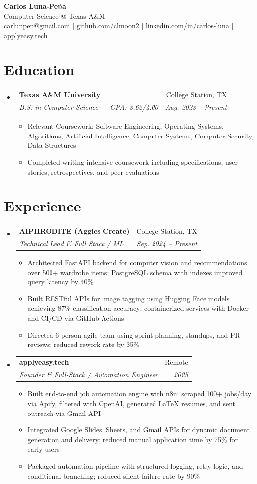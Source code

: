 \documentclass[letterpaper,11pt]{article}
\makeatletter
\newcommand{\resumeItem}[1]{
  \item\small{{#1 \vspace{-2pt}}}
}
\newcommand{\resumeSubheading}[4]{
  \vspace{-2pt}\item
    \begin{tabular*}{0.97\textwidth}[t]{l@{\extracolsep{\fill}}r}
      \textbf{#1} & #2 \\
      \textit{\small#3} & \textit{\small #4} \\
    \end{tabular*}\vspace{-7pt}
}
\newcommand{\resumeSubHeadingListStart}{\begin{itemize}[leftmargin=0.15in, label={}]}
\newcommand{\resumeSubHeadingListEnd}{\end{itemize}}
\newcommand{\resumeItemListStart}{\begin{itemize}}
\newcommand{\resumeItemListEnd}{\end{itemize}\vspace{-5pt}}
\makeatother
\begin{document}
\begin{center}
  \textbf{\Huge Carlos Luna-Pe\~na} \\
  \small Computer Science @ Texas A\&M \\
  \href{mailto:carlunpen@gmail.com}{carlunpen@gmail.com} $|$ 
  \href{https://github.com/clmoon2}{github.com/clmoon2} $|$
  \href{https://linkedin.com/in/carlos-luna}{linkedin.com/in/carlos-luna} $|$
  \href{https://applyeasy.tech}{applyeasy.tech}
\end{center}

\section{Education}
\resumeSubHeadingListStart
  \resumeSubheading
    {Texas A\&M University}{College Station, TX}
    {B.S. in Computer Science — GPA: 3.62/4.00}{Aug. 2023 -- Present}
    \resumeItemListStart
      \resumeItem{Relevant Coursework: Software Engineering, Operating Systems, Algorithms, Artificial Intelligence, Computer Systems, Computer Security, Data Structures}
      \resumeItem{Completed writing-intensive coursework including specifications, user stories, retrospectives, and peer evaluations}
    \resumeItemListEnd
\resumeSubHeadingListEnd

\section{Experience}
\resumeSubHeadingListStart
  \resumeSubheading
    {AIPHRODITE (Aggies Create)}{College Station, TX}
    {Technical Lead \& Full Stack / ML}{Sep. 2024 -- Present}
    \resumeItemListStart
      \resumeItem{Architected FastAPI backend for computer vision and recommendations over 500+ wardrobe items; PostgreSQL schema with indexes improved query latency by 40\%}
      \resumeItem{Built RESTful APIs for image tagging using Hugging Face models achieving 87\% classification accuracy; containerized services with Docker and CI/CD via GitHub Actions}
      \resumeItem{Directed 6-person agile team using sprint planning, standups, and PR reviews; reduced rework rate by 35\%}
    \resumeItemListEnd

  \resumeSubheading
    {applyeasy.tech}{Remote}
    {Founder \& Full-Stack / Automation Engineer}{2025}
    \resumeItemListStart
      \resumeItem{Built end-to-end job automation engine with n8n: scraped 100+ jobs/day via Apify, filtered with OpenAI, generated LaTeX resumes, and sent outreach via Gmail API}
      \resumeItem{Integrated Google Slides, Sheets, and Gmail APIs for dynamic document generation and delivery; reduced manual application time by 75\% for early users}
      \resumeItem{Packaged automation pipeline with structured logging, retry logic, and conditional branching; reduced silent failure rate by 90\%}
    \resumeItemListEnd
\resumeSubHeadingListEnd
\end{document}
